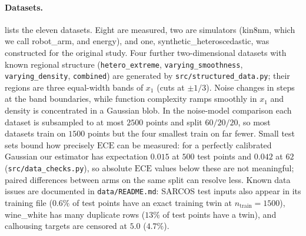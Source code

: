\documentclass[11pt]{article}
\newcommand{\ece}{\mathrm{ECE}}
\begin{document}
\paragraph{Datasets.}  lists the eleven datasets. Eight are measured,
two are simulators (kin8nm, which we call robot\_arm, and energy), and one,
synthetic\_heteroscedastic, was constructed for the original study. Four further
two-dimensional datasets with known regional structure (\texttt{hetero\_extreme},
\texttt{varying\_smoothness}, \texttt{varying\_density}, \texttt{combined}) are generated
by \texttt{src/structured\_data.py}; their regions are three equal-width bands of $x_1$ (cuts at $\pm1/3$). Noise
changes in steps at the band boundaries, while function complexity ramps smoothly
in $x_1$ and density is concentrated in a Gaussian blob. In the noise-model comparison each dataset is
subsampled to at most $2500$ points and split $60/20/20$, so most datasets train on
$1500$ points but the four smallest train on far fewer. Small test sets bound how
precisely $\ece$ can be measured: for a perfectly calibrated Gaussian our estimator
has expectation $0.015$ at $500$ test points and $0.042$ at $62$
(\texttt{src/data\_checks.py}), so absolute $\ece$ values below these are not
meaningful; paired differences between arms on the same split can resolve less.
Known data issues are documented in \texttt{data/README.md}: SARCOS test inputs also
appear in its training file ($0.6\%$ of test points have an exact training twin at
$n_{\text{train}}=1500$), wine\_white has many duplicate rows ($13\%$ of test points
have a twin), and calhousing targets are censored at $5.0$ ($4.7\%$).
\end{document}
